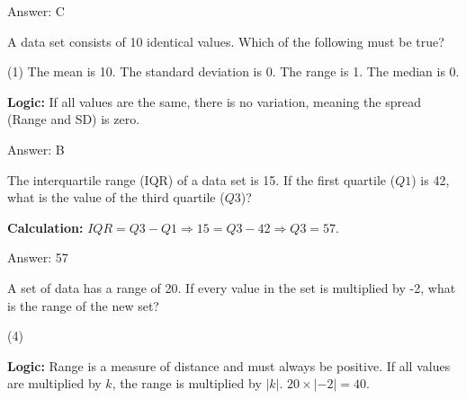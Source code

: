 \documentclass[11pt,paper=a4,answers]{exam}
\begin{document}
\begin{questions}
\begin{solution}
\vspace{30pt}

Answer: \colorbox{yellow!100}{C}
\end{solution}

\vspace{60pt}

\question
A data set consists of 10 identical values. Which of the following must be true?
\begin{tasks}(1)
    \task The mean is 10.
    \task The standard deviation is 0.
    \task The range is 1.
    \task The median is 0.
\end{tasks}

\begin{solution}
\textbf{Logic:} If all values are the same, there is no variation, meaning the spread (Range and SD) is zero.

\vspace{30pt}

Answer: \colorbox{yellow!100}{B}
\end{solution}

\vspace{60pt}

\question
The interquartile range (IQR) of a data set is 15. If the first quartile ($Q1$) is 42, what is the value of the third quartile ($Q3$)?

\begin{solution}
\textbf{Calculation:} $IQR = Q3 - Q1 \Rightarrow 15 = Q3 - 42 \Rightarrow Q3 = 57$.

\vspace{30pt}

Answer: \colorbox{yellow!100}{57}
\end{solution}

\vspace{60pt}

\question
A set of data has a range of 20. If every value in the set is multiplied by -2, what is the range of the new set?
\begin{tasks}(4)
\end{tasks}

\begin{solution}
\textbf{Logic:} Range is a measure of distance and must always be positive. If all values are multiplied by $k$, the range is multiplied by $|k|$. $20 \times |-2| = 40$.


\end{solution}
\end{questions}
\end{document}
